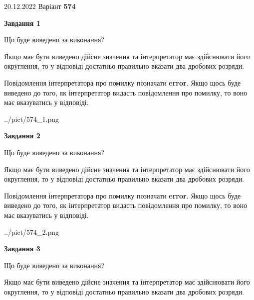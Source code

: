 \documentclass[12pt, ukrainian]{article}
\begin{document}
{20.12.2022 Варіант \No \textbf { 574 }\par}
{
\begin {Large}

{\begin {center}\textbf{Завдання 1}\end {center}}\par
Що буде виведено за виконання? \par

Якщо має бути виведено дійсне значення та інтерпретатор має здійснювати його округлення, 
то у відповіді достатньо правильно вказати два дробових розряди.

Повідомлення інтерпретатора про помилку позначати \textbf{error}.
Якщо щось буде виведено до того, як інтерпретатор видасть повідомлення про помилку, 
то воно має вказуватись у відповіді. \par

\begin{center}
	{../pict/574_1.png}
\end{center}
\newpage

{\begin {center}\textbf{Завдання 2}\end {center}}\par
Що буде виведено за виконання? \par

Якщо має бути виведено дійсне значення та інтерпретатор має здійснювати його округлення, 
то у відповіді достатньо правильно вказати два дробових розряди.

Повідомлення інтерпретатора про помилку позначати \textbf{error}.
Якщо щось буде виведено до того, як інтерпретатор видасть повідомлення про помилку, 
то воно має вказуватись у відповіді. \par

\begin{center}
	{../pict/574_2.png}
\end{center}
\newpage

{\begin {center}\textbf{Завдання 3}\end {center}}\par
Що буде виведено за виконання? \par

Якщо має бути виведено дійсне значення та інтерпретатор має здійснювати його округлення, 
то у відповіді достатньо правильно вказати два дробових розряди.


\end{Large}}
\end{document}
